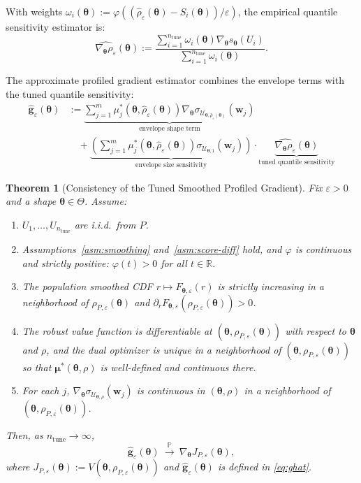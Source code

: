 \documentclass[lettersize,journal]{IEEEtran}
\newcommand{\R}{\mathbb{R}}
\newcommand{\Prob}{\mathbb{P}}
\newcommand{\cU}{\mathcal{U}}
\newcommand{\btheta}{\bm{\theta}}
\newcommand{\bmu}{\bm{\mu}}
\newcommand{\bw}{\bm{w}}
\newcommand{\bg}{\bm{g}}
\newtheorem{theorem}{Theorem}
\theoremstyle{definition}
\begin{document}
With weights $\omega_i(\btheta) := \varphi((\hat{\rho}_\varepsilon(\btheta) - S_i(\btheta))/\varepsilon)$, the empirical quantile sensitivity estimator is:
\begin{equation}\label{eq:rhohat-grad}
\widehat{\nabla_{\btheta} \rho_\varepsilon}(\btheta) := \frac{\sum_{i=1}^{n_{\text{tune}}} \omega_i(\btheta) \nabla_{\btheta} s_{\btheta}(U_i)}{\sum_{i=1}^{n_{\text{tune}}} \omega_i(\btheta)}.
\end{equation}

The approximate profiled gradient estimator combines the envelope terms with the tuned quantile sensitivity:
\begin{equation}\label{eq:ghat}
\boxed{
\begin{aligned}
\hat{\bg}_\varepsilon(\btheta) &:= \underbrace{\sum_{j=1}^m \mu_j^*(\btheta, \hat{\rho}_\varepsilon(\btheta)) \nabla_{\btheta} \sigma_{\cU_{\btheta,\hat{\rho}_\varepsilon(\btheta)}}(\bw_j)}_{\text{envelope shape term}} \\
&\quad + \underbrace{\left(\sum_{j=1}^m \mu_j^*(\btheta, \hat{\rho}_\varepsilon(\btheta)) \sigma_{\cU_{\btheta,1}}(\bw_j)\right)}_{\text{envelope size sensitivity}} \cdot \underbrace{\widehat{\nabla_{\btheta} \rho_\varepsilon}(\btheta)}_{\text{tuned quantile sensitivity}}
\end{aligned}
}
\end{equation}

\begin{theorem}[Consistency of the Tuned Smoothed Profiled Gradient]\label{thm:consistency-eps}
Fix $\varepsilon>0$ and a shape $\btheta\in\Theta$.
Assume:

\begin{enumerate}
\item[(A1)] $U_1,\ldots,U_{n_{\mathrm{tune}}}$ are i.i.d.\ from $P$.
\item[(A2)] Assumptions~\ref{asm:smoothing} and~\ref{asm:score-diff} hold, and $\varphi$ is continuous and strictly positive: $\varphi(t)>0$ for all $t\in\R$.
\item[(A3)] The population smoothed CDF $r\mapsto F_{\btheta,\varepsilon}(r)$ is strictly increasing in a neighborhood of
$\rho_{P,\varepsilon}(\btheta)$ and $\partial_r F_{\btheta,\varepsilon}(\rho_{P,\varepsilon}(\btheta))>0$.
\item[(A4)] The robust value function is differentiable at $(\btheta,\rho_{P,\varepsilon}(\btheta))$ with respect to $\btheta$ and $\rho$,
and the dual optimizer is unique in a neighborhood of $(\btheta,\rho_{P,\varepsilon}(\btheta))$ so that
$\bmu^*(\btheta,\rho)$ is well-defined and continuous there.
\item[(A5)] For each $j$, $\nabla_{\btheta}\sigma_{\cU_{\btheta,\rho}}(\bw_j)$ is continuous in $(\btheta,\rho)$ in a neighborhood of
$(\btheta,\rho_{P,\varepsilon}(\btheta))$.
\end{enumerate}

Then, as $n_{\mathrm{tune}}\to\infty$,
\[
\hat{\bg}_\varepsilon(\btheta)\ \xrightarrow{\ \Prob\ }\ \nabla_{\btheta}J_{P,\varepsilon}(\btheta),
\]
where $J_{P,\varepsilon}(\btheta):=V(\btheta,\rho_{P,\varepsilon}(\btheta))$ and $\hat{\bg}_\varepsilon(\btheta)$ is defined in \eqref{eq:ghat}.
\end{theorem}
\end{document}
